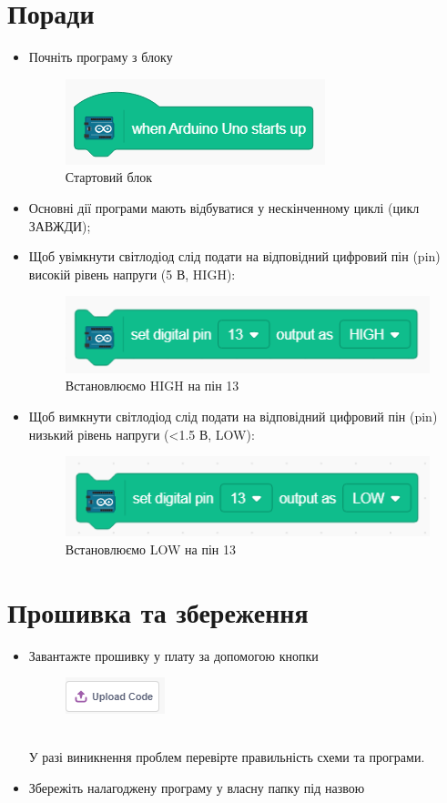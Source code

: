 \documentclass[oneside, final]{article}
\begin{document}
\section{Поради}
	\begin{itemize}
		\item Почніть програму з блоку
			\begin{figure}[!h]
				\centering
				\includegraphics[scale=0.75]{UNO_start.png}
				\caption{Стартовий блок}
			\end{figure}
		\item Основні дії програми мають відбуватися у нескінченному циклі (цикл ЗАВЖДИ);
		\item Щоб увімкнути світлодіод слід подати на відповідний цифровий пін (pin) високій рівень напруги (5 В, HIGH):
			\begin{figure}[!h]
				\centering
				\includegraphics[scale=0.75]{setPin13HIGH.png}
				\caption{Встановлюємо HIGH на пін 13 }
			\end{figure}
		\item Щоб вимкнути світлодіод слід подати на відповідний цифровий пін (pin) низький рівень напруги (<1.5 В, LOW):
			\begin{figure}[h!]
				\centering
				\includegraphics[scale=0.75]{setPin13LOW.png}
				\caption{Встановлюємо LOW на пін 13}
			\end{figure}
	\end{itemize}

\section{Прошивка та збереження}
	\begin{itemize}
	\item Завантажте прошивку у плату за допомогою кнопки
		\begin{figure}[h!]
			\centering
			\includegraphics[]{upload.png}
		\end{figure}
		\\У разі виникнення проблем перевірте правильність схеми та програми.
	\item Збережіть налагоджену програму у власну папку під назвою 
\end{itemize}
\end{document}
